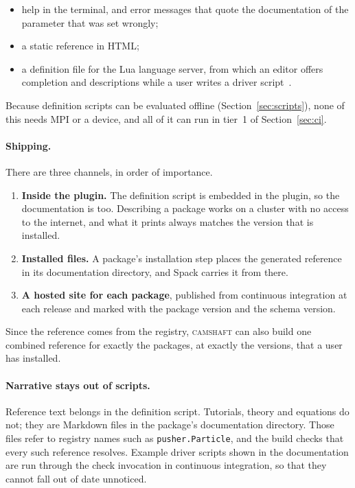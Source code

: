 \documentclass[11pt,a4paper]{article}
\newcommand{\camshaft}{\textsc{camshaft}}
\newcommand{\code}[1]{\texttt{#1}}
\begin{document}
\begin{itemize}
  \item help in the terminal, and error messages that quote the
        documentation of the parameter that was set wrongly;
  \item a static reference in HTML;
  \item a definition file for the Lua language server, from which an editor
        offers completion and descriptions while a user writes a driver
        script~\cite{luals}.
\end{itemize}

Because definition scripts can be evaluated offline
(Section~\ref{sec:scripts}), none of this needs MPI or a device, and all of
it can run in tier~1 of Section~\ref{sec:ci}.

\paragraph{Shipping.}  There are three channels, in order of importance.

\begin{enumerate}
  \item \textbf{Inside the plugin.}  The definition script is embedded in
        the plugin, so the documentation is too.  Describing a package works
        on a cluster with no access to the internet, and what it prints
        always matches the version that is installed.
  \item \textbf{Installed files.}  A package's installation step places the
        generated reference in its documentation directory, and Spack
        carries it from there.
  \item \textbf{A hosted site for each package}, published from continuous
        integration at each release and marked with the package version and
        the schema version.
\end{enumerate}

Since the reference comes from the registry, \camshaft{} can also build one
combined reference for exactly the packages, at exactly the versions, that a
user has installed.

\paragraph{Narrative stays out of scripts.}  Reference text belongs in the
definition script.  Tutorials, theory and equations do not; they are
Markdown files in the package's documentation directory.  Those files refer
to registry names such as \code{pusher.Particle}, and the build checks that
every such reference resolves.  Example driver scripts shown in the
documentation are run through the check invocation in continuous
integration, so that they cannot fall out of date unnoticed.
\end{document}

